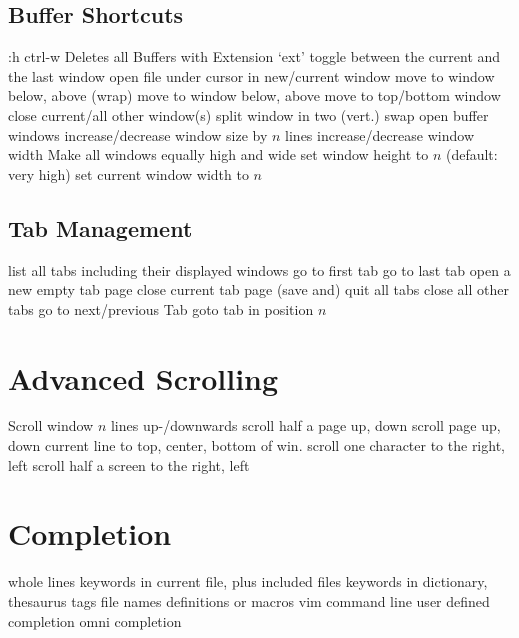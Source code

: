 \subsection{Buffer Shortcuts}	{:h ctrl-w }
	{Deletes all Buffers with Extension `ext'}
\cmdS{\ctrl \^{} }	{toggle between the current and the last window}
	{open file under cursor in new/current window}
	{move to window below, above (wrap)}
	{move to window below, above}
	{move to top/bottom window}
	{close current/all other window(s)}
	{split window in two (vert.)}
	{swap open buffer windows }
	{increase/decrease window size by $n$ lines}
	{increase/decrease window width}
	{Make all windows equally high and wide}
	{set window height to $n$ (default: very high) }
	{set current window width to $n$ }

\subsection{Tab Management}	{}
	{list all tabs including their displayed windows}
	{go to first tab}
	{go to last tab}
	{open a new empty tab page}
	{close current tab page}
	{(save and) quit all tabs}
	{close all other tabs}
	{go to next/previous Tab}
	{goto tab in position $n$ }

\section{Advanced Scrolling}	{}
	{Scroll window $n$ lines up-/downwards}
	{scroll half a page up, down}
	{scroll page up, down}
	{current line to top, center, bottom of win.}
	{scroll one character to the right, left}
	{scroll half a screen to the right, left}


\vskip -0.2cm
\section{Completion}	{}
	{whole lines}
	{keywords in current file, plus included files}
	{keywords in dictionary, thesaurus}
\cmdS{\ctrl{}X\ctrl{}]}	{tags}
	{file names}
	{definitions or macros}
	{vim command line}
	{user defined completion}
	{omni completion}

